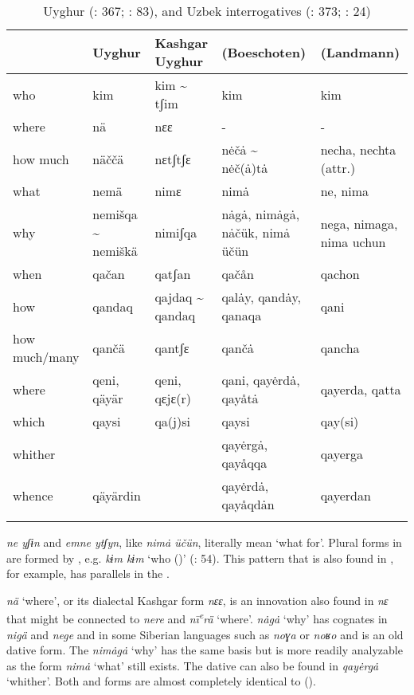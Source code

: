\begin{table}[p]
\caption{Uyghur (\citealt{TuohutiLitifu2012}: 367; \citealt{Mi1997}: 83), and Uzbek interrogatives (\citealt{Boeschoten1998}: 373; \citealt{Landmann2010}: 24)}
\label{tab:turk:12}

\begin{tabularx}{\textwidth}{lQQQQ}
\lsptoprule
& \textbf{Uyghur} & \textbf{Kashgar Uyghur} & \textbf{ (Boeschoten)} & \textbf{ (Landmann)}\\
\midrule
who & kim & kim {\textasciitilde} tʃim & kim & kim\\
where & nä & nɛɛ & - & -\\
how much & näččä & nɛtʃtʃɛ & n\.eč\.{a} {\textasciitilde} n\.eč(\.{a})t\.{a} & necha, nechta (attr.)\\
what & nemä & nimɛ & nim\.{a} & ne, nima\\
why & nemišqa {\textasciitilde} nemiškä & nimiʃqa & n\.{a}g\.{a}, nim\.{a}g\.{a}, n\.{a}čük, nim\.{a} üčün & nega, nimaga, nima uchun\\
when & qačan & qatʃan & qačån & qachon\\
how & qandaq & qajdaq {\textasciitilde} qandaq & qal\.{a}y, qand\.{a}y, qanaqa & qani\\
how much/many & qančä & qantʃɛ & qanč\.{a} & qancha\\
where & qeni, qäyär & qeni, qɛjɛ(r) & qani, qay\.erd\.{a}, qayåt\.{a} & qayerda, qatta\\
which & qaysi & qa(j)si & qaysi & qay(si)\\
whither &  &  & qay\.erg\.{a}, qayåqqa & qayerga\\
whence & qäyärdin &  & qay\.erd\.{a}, qayåqd\.{a}n & qayerdan\\
\lspbottomrule
\end{tabularx}
\end{table}

 \textit{ne yʃɨn} and  \textit{emne ytʃyn}, like  \textit{nim\.{a} üčün}, literally mean ‘what for’. Plural forms in  are formed by , e.g. \textit{kɨm kɨm} ‘who ()’ (\citealt{GengShiminLiZengxiang1985}: 54). This pattern that is also found in , for example, has parallels in the .

 \textit{nä} ‘where’, or its dialectal Kashgar form \textit{nɛɛ}, is an innovation also found in  \textit{nɛ} that might be connected to  \textit{nere} and  \textit{n\={\i}\textsuperscript{e}}\textit{rä} ‘where’.  \textit{n\.{a}g\.{a}} ‘why’ has cognates in  \textit{nigä} and  \textit{nege} and in some Siberian languages such as  \textit{noɣa} or  \textit{noʁo} and is an old dative form. The   \textit{nim\.{a}g\.{a}} ‘why’ has the same basis but is more readily analyzable as the form \textit{nim\.{a}} ‘what’ still exists. The dative can also be found in \textit{qay\.erg\.{a}} ‘whither’. Both  and  forms are almost completely identical to  ().


